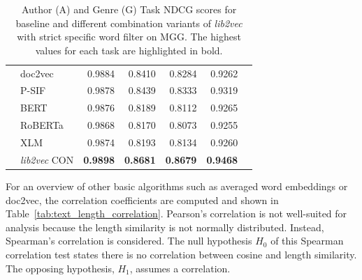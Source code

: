 \documentclass[11pt]{article}
\begin{document}
\begin{table}[ht!]
\begin{tabular}{@{}L{0.5cm}lrrrrr@{}}
		& doc2vec               & 0.9884 & 0.8410 & 0.8284          & 0.9262          \\
		& P-SIF                 & 0.9878          & 0.8439          & 0.8333 & 0.9319          \\
		& BERT                  & 0.9876          & 0.8189          & 0.8112          & 0.9265          \\
		& RoBERTa               & 0.9868          & 0.8170          & 0.8073          & 0.9255          \\
		& XLM                   & 0.9874          & 0.8193          & 0.8134          & 0.9260          \\ 
		& \emph{lib2vec} CON      & \textbf{0.9898} & \textbf{0.8681}          & \textbf{0.8679} & \textbf{0.9468} \\
	\end{tabular}
	\caption[]{Author (A) and Genre (G) Task NDCG scores for baseline and different combination variants of \emph{lib2vec} with strict specific word filter on MGG. The highest values for each task are highlighted in bold.}
	\label{table:ndcg_gcc}
\end{table}

For an overview of other basic algorithms such as averaged word embeddings or doc2vec, the correlation coefficients are computed and shown in Table~\ref{tab:text_length_correlation}.
Pearson's correlation is not well-suited for analysis because the length similarity is not normally distributed.
Instead, Spearman's correlation is considered.
The null hypothesis $H_0$ of this Spearman correlation test states there is no correlation between cosine and length similarity.
The opposing hypothesis, $H_1$, assumes a correlation.
\end{document}

